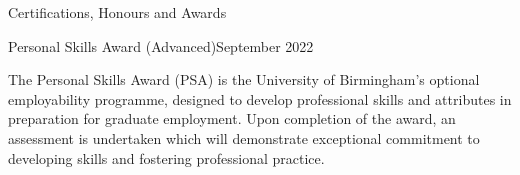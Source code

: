 \documentclass{resume} %
\begin{document}

\begin{rSection}{Certifications, Honours and Awards}
\begin{rSubsection}{Personal Skills Award (Advanced)}{September 2022}{}{}
\item The Personal Skills Award (PSA) is the University of Birmingham’s optional employability programme, designed to develop professional skills and attributes in preparation for graduate employment. Upon completion of the award, an assessment is undertaken which will demonstrate exceptional commitment to developing skills and fostering professional practice.
\end{rSubsection}
\end{rSection}



\end{document}
